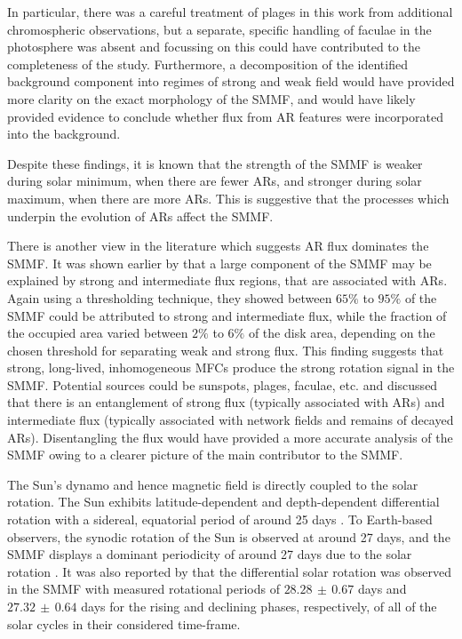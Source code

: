 In particular, there was a careful treatment of plages in this work from additional chromospheric observations, but a separate, specific handling of faculae in the photosphere was absent and focussing on this could have contributed to the completeness of the study. Furthermore, a decomposition of the identified background component into regimes of strong and weak field would have provided more clarity on the exact morphology of the SMMF, and would have likely provided evidence to conclude whether flux from AR features were incorporated into the background.

Despite these findings, it is known that the strength of the SMMF is weaker during solar minimum, when there are fewer ARs, and stronger during solar maximum, when there are more ARs. This is suggestive that the processes which underpin the evolution of ARs affect the SMMF.

There is another view in the literature which suggests AR flux dominates the SMMF. It was shown earlier by \citet{kutsenko_contribution_2017} that a large component of the SMMF may be explained by strong and intermediate flux regions, that are associated with ARs. Again using a thresholding technique, they showed between $65 \%$ to $95 \%$ of the SMMF could be attributed to strong and intermediate flux, while the fraction of the occupied area varied between $2 \%$ to $6 \%$ of the disk area, depending on the chosen threshold for separating weak and strong flux. This finding suggests that strong, long-lived, inhomogeneous MFCs produce the strong rotation signal in the SMMF. Potential sources could be sunspots, plages, faculae, etc. and \citet{kutsenko_contribution_2017} discussed that there is an entanglement of strong flux (typically associated with ARs) and intermediate flux (typically associated with network fields and remains of decayed ARs). Disentangling the flux would have provided a more accurate analysis of the SMMF owing to a clearer picture of the main contributor to the SMMF.

The Sun's dynamo and hence magnetic field is directly coupled to the solar rotation. The Sun exhibits latitude-dependent and depth-dependent differential rotation with a sidereal, equatorial period of around 25 days \citep{howe_solar_2009}. To Earth-based observers, the synodic rotation of the Sun is observed at around 27 days, and the SMMF displays a dominant periodicity of around 27 days due to the solar rotation \citep{chaplin_studies_2003, xie_temporal_2017, bose_variability_2018}. It was also reported by \citet{xie_temporal_2017} that the differential solar rotation was observed in the SMMF with measured rotational periods of $28.28 \, \pm \, 0.67$ days and $27.32 \, \pm \, 0.64$ days for the rising and declining phases, respectively, of all of the solar cycles in their considered time-frame.

